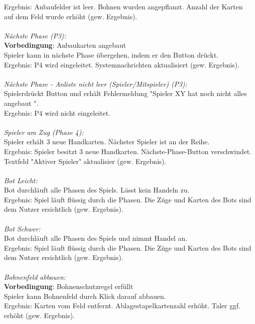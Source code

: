 \documentclass[10pt]{report}
\begin{document}
		Ergebnis: Anbaufelder ist leer. Bohnen wurden angepflanzt. Anzahl der Karten auf dem Feld wurde 			erh\"oht (gew. Ergebnis). \\
		\\
		\textsl{Nächste Phase (P3):} \\
		\textbf{Vorbedingung}: Anbaukarten angebaut \\
		Spieler kann in nächste Phase übergehen, indem er den Button drückt.  \\
		Ergebnis: P4 wird eingeleitet. Systemnachrichten aktualisiert (gew. Ergebnis). \\
		\\
		\textsl{Nächste Phase - Anliste nicht leer (Spieler/Mitspieler) (P3):} \\
		Spielerdrückt Button und erhält Fehlermeldung "Spieler XY hat noch nicht alles angebaut ".  \\
		Ergebnis: P4 wird nicht eingeleitet. \\
		\\
		\textsl{Spieler am Zug (Phase 4):} \\
		Spieler erhält 3 neue Handkarten. Nächster Spieler ist an der Reihe. \\
		Ergebnis: Spieler besitzt 3 neue Handkarten. N\"achste-Phase-Button verschwindet. Textfeld "Aktiver Spieler" aktualisier (gew. Ergebnis).	\\
		\\
		\textsl{Bot Leicht:}  \\
		Bot durchläuft alle Phasen des Spiels. Lässt kein Handeln zu. \\
		Ergebnis: Spiel läuft fl\"ussig durch die Phasen. Die Z\"uge und Karten des Bots sind dem Nutzer 			ersichtlich (gew. Ergebnis). \\
		\\
		\textsl{Bot Schwer:} \\
		Bot durchläuft alle Phasen des Spiels und nimmt Handel an. \\
		Ergebnis: Spiel läuft fl\"ussig durch die Phasen. Die Z\"uge und Karten des Bots sind dem Nutzer 			ersichtlich (gew. Ergebnis). \\
		\\
		\textsl{Bohnenfeld abbauen:} \\
		\textbf{Vorbedingung}: Bohnenschutzregel erfüllt \\
		Spieler kann Bohnenfeld durch Klick darauf abbauen. \\
		Ergebnis: Karten vom Feld entfernt. Ablagestapelkartenzahl erhöht. Taler ggf. erhöht (gew. Ergebnis).\\
\end{document}
